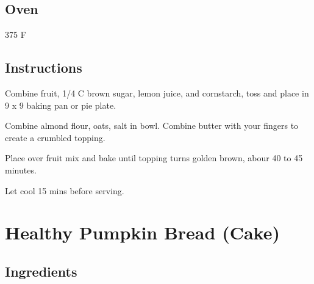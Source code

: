 \documentclass[ansiapaper,10pt,english]{sphinxmanual}
\begin{document}
\section{Oven}
\label{\detokenize{Peach_Crisp:oven}}
375 F


\section{Instructions}
\label{\detokenize{Peach_Crisp:instructions}}
Combine fruit, 1/4 C brown sugar, lemon juice, and cornstarch, toss and place in 9 x 9 baking pan or pie plate.

Combine almond flour, oats, salt in bowl.  Combine butter with your fingers to create a crumbled topping.

Place over fruit mix and bake until topping turns golden brown, abour 40 to 45 minutes.

Let cool 15 mins before serving.


\chapter{Healthy Pumpkin Bread (Cake)}
\label{\detokenize{Pumpkin_Bread:healthy-pumpkin-bread-cake}}\label{\detokenize{Pumpkin_Bread::doc}}

\section{Ingredients}
\label{\detokenize{Pumpkin_Bread:ingredients}}
%
\begin{sphinxVerbatim}[commandchars=\\\{\}]
   

   

 

   

  

     

          

  

  

   

     
\end{sphinxVerbatim}
\end{document}
